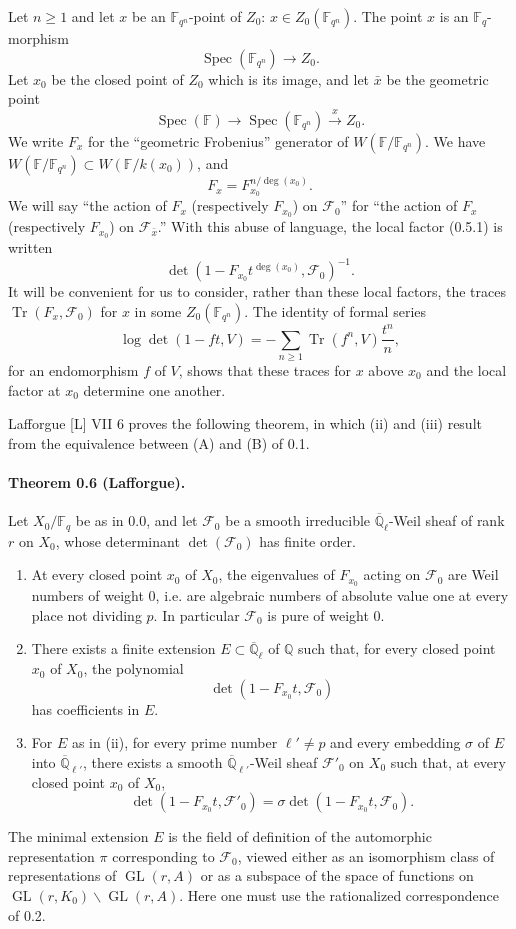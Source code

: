 \documentclass[11pt]{article}
\newcommand{\F}{\mathbb{F}}
\newcommand{\Q}{\mathbb{Q}}
\newcommand{\Ql}{\overline{\mathbb Q}_{\ell}}
\newcommand{\Tr}{\operatorname{Tr}}
\newcommand{\Spec}{\operatorname{Spec}}
\newcommand{\GL}{\operatorname{GL}}
\begin{document}
Let $n\ge 1$ and let $x$ be an $\F_{q^n}$-point of $Z_0$: $x\in Z_0(\F_{q^n})$.
The point $x$ is an $\F_q$-morphism
\[
 \Spec(\F_{q^n})\longrightarrow Z_0.
\]
Let $x_0$ be the closed point of $Z_0$ which is its image, and let $\bar x$ be the geometric point
\[
 \Spec(\F)\longrightarrow\Spec(\F_{q^n})\xrightarrow{x}Z_0.
\]
We write $F_x$ for the ``geometric Frobenius'' generator of $W(\F/\F_{q^n})$.
We have $W(\F/\F_{q^n})\subset W(\F/k(x_0))$, and
\begin{equation}
F_x=F_{x_0}^{n/\deg(x_0)}.
\tag{0.5.2}
\end{equation}
We will say ``the action of $F_x$ (respectively $F_{x_0}$) on $\mathcal F_0$'' for ``the action of $F_x$ (respectively $F_{x_0}$) on $\mathcal F_{\bar x}$.''
With this abuse of language, the local factor (0.5.1) is written
\[
\det\left(1-F_{x_0}t^{\deg(x_0)},\mathcal F_0\right)^{-1}.
\]
It will be convenient for us to consider, rather than these local factors, the traces $\Tr(F_x,\mathcal F_0)$ for $x$ in some $Z_0(\F_{q^n})$.
The identity of formal series
\[
 \log\det(1-ft,V)=-\sum_{n\ge1}\Tr(f^n,V)\frac{t^n}{n},
\]
for an endomorphism $f$ of $V$, shows that these traces for $x$ above $x_0$ and the local factor at $x_0$ determine one another.

Lafforgue [L] VII 6 proves the following theorem, in which (ii) and (iii) result from the equivalence between (A) and (B) of 0.1.

\paragraph{Theorem 0.6 (Lafforgue).}
Let $X_0/\F_q$ be as in 0.0, and let $\mathcal F_0$ be a smooth irreducible $\Ql$-Weil sheaf of rank $r$ on $X_0$, whose determinant $\det(\mathcal F_0)$ has finite order.
\begin{enumerate}[label=(\roman*)]
\item At every closed point $x_0$ of $X_0$, the eigenvalues of $F_{x_0}$ acting on $\mathcal F_0$ are Weil numbers of weight $0$, i.e. are algebraic numbers of absolute value one at every place not dividing $p$. In particular $\mathcal F_0$ is pure of weight $0$.
\item There exists a finite extension $E\subset\Ql$ of $\Q$ such that, for every closed point $x_0$ of $X_0$, the polynomial
\[
 \det(1-F_{x_0}t,\mathcal F_0)
\]
has coefficients in $E$.
\item For $E$ as in (ii), for every prime number $\ell'\ne p$ and every embedding $\sigma$ of $E$ into $\overline{\mathbb Q}_{\ell'}$, there exists a smooth $\overline{\mathbb Q}_{\ell'}$-Weil sheaf $\mathcal F'_0$ on $X_0$ such that, at every closed point $x_0$ of $X_0$,
\[
 \det(1-F_{x_0}t,\mathcal F'_0)=\sigma\det(1-F_{x_0}t,\mathcal F_0).
\]
\end{enumerate}
The minimal extension $E$ is the field of definition of the automorphic representation $\pi$ corresponding to $\mathcal F_0$, viewed either as an isomorphism class of representations of $\GL(r,A)$ or as a subspace of the space of functions on $\GL(r,K_0)\backslash\GL(r,A)$.
Here one must use the rationalized correspondence of 0.2.
\end{document}
